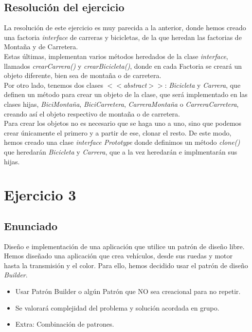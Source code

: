 \documentclass{article} %
\begin{document}
    \subsection{Resolución del ejercicio}

    \hspace*{1cm}La resolución de este ejercicio es muy parecida a la anterior, donde hemos creado una factoria \textit{interface}
    de carreras y bicicletas, de la que heredan las factorias de Montaña y de Carretera. \\
    Estas últimas, implementan varios métodos heredados de la clase \textit{interface}, llamados
    \textit{crearCarrera()} y \textit{crearBicicleta()}, donde en cada Factoria se creará un objeto diferente, bien sea 
    de montaña o de carretera. \\
    Por otro lado, tenemos dos clases $<<$\textit{abstract}$>>$: \textit{Bicicleta} y \textit{Carrera}, que definen
    un método para crear un objeto de la clase, que será implementado en las clases hijas, \textit{BiciMontaña}, 
    \textit{BiciCarretera}, \textit{CarreraMontaña} o \textit{CarreraCarretera}, creando así el objeto
    respectivo de montaña o de carretera.\\

    \hspace*{1cm}Para crear los objetos no es necesario que se haga uno a uno, sino que podemos crear únicamente el primero y a 
    partir de ese, clonar el resto. De este modo, hemos creado una clase \textit{interface Prototype} donde definimos un 
    método \textit{clone()} que heredarán \textit{Bicicleta} y \textit{Carrera}, que a la vez heredarán e implmentarán sus hijas.

    \section{Ejercicio 3}
    \subsection{Enunciado}
    \hspace*{1cm}Diseño e implementación de una aplicación que utilice un patrón de diseño libre.
    Hemos diseñado una aplicación que crea vehículos, desde sus ruedas y motor hasta la transmisión y el color. Para ello, hemos 
    decidido usar el patrón de diseño \textit{Builder}.

    \begin{itemize}
        \item Usar Patrón Builder o algún Patrón que NO sea creacional para no repetir.
        \item Se valorará complejidad del problema y solución acordada en grupo.
        \item Extra: Combinación de patrones.
    \end{itemize}
\end{document}
